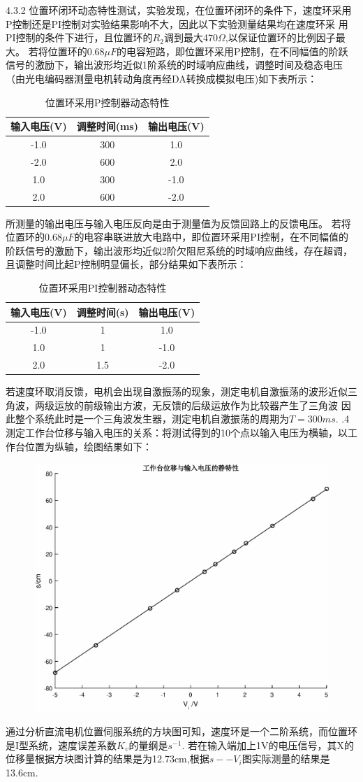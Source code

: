 \documentclass[10.5pt]{ctexart}
\begin{document}
4.3.2 位置环闭环动态特性测试，实验发现，在位置环闭环的条件下，速度环采用P控制还是PI控制对实验结果影响不大，因此以下实验测量结果均在速度环采
用PI控制的条件下进行，且位置环的$R_2$调到最大470$\Omega$,以保证位置环的比例因子最大。
若将位置环的0.68$\mu F$的电容短路，即位置环采用P控制，在不同幅值的阶跃信号的激励下，输出波形均近似1阶系统的时域响应曲线，调整时间及稳态电压（由光电编码器测量电机转动角度再经DA转换成模拟电压)如下表所示：
\begin{table}[!ht]
\centering
\caption{位置环采用P控制器动态特性}
\begin{tabular}{ccc}
\hline
输入电压(V) & 调整时间(ms) & 输出电压(V)\\
\hline
-1.0 & 300 & 1.0\\
-2.0 & 600 & 2.0 \\
1.0 & 300 & -1.0\\
2.0 & 600 & -2.0 \\
\hline
\end{tabular}
\end{table}
所测量的输出电压与输入电压反向是由于测量值为反馈回路上的反馈电压。
若将位置环的0.68$\mu F$的电容串联进放大电路中，即位置环采用PI控制，在不同幅值的阶跃信号的激励下，输出波形均近似2阶欠阻尼系统的时域响应曲线，存在超调，且调整时间比起P控制明显偏长，部分结果如下表所示：
\begin{table}[!ht]
\centering
\caption{位置环采用PI控制器动态特性}
\begin{tabular}{ccc}
\hline
输入电压(V) & 调整时间(s) & 输出电压(V)\\
\hline
-1.0 & 1 & 1.0\\
1.0 & 1 & -1.0\\
2.0 & 1.5 & -2.0 \\
\hline
\end{tabular}
\end{table}
若速度环取消反馈，电机会出现自激振荡的现象，测定电机自激振荡的波形近似三角波，两级运放的前级输出方波，无反馈的后级运放作为比较器产生了三角波
因此整个系统此时是一个三角波发生器，测定电机自激振荡的周期为$T=300ms$.
.4 测定工作台位移与输入电压的关系：将测试得到的10个点以输入电压为横轴，以工作台位置为纵轴，绘图结果如下：
\begin{figure}[!ht]
\centering
\includegraphics[width=400pt]{static111.eps}
\end{figure}
通过分析直流电机位置伺服系统的方块图可知，速度环是一个二阶系统，而位置环是I型系统，速度误差系数$K_v$的量纲是$s^{-1}$.
若在输入端加上1V的电压信号，其X的位移量根据方块图计算的结果是为12.73cm,根据$s--V_i$图实际测量的结果是13.6cm.
\end{document}
